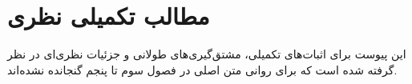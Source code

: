 \chapter{مطالب تکمیلی نظری}
\label{app:theory}

این پیوست برای اثبات‌های تکمیلی، مشتق‌گیری‌های طولانی و جزئیات نظری‌ای در نظر گرفته شده است که برای روانی متن اصلی در فصول سوم تا پنجم گنجانده نشده‌اند.

